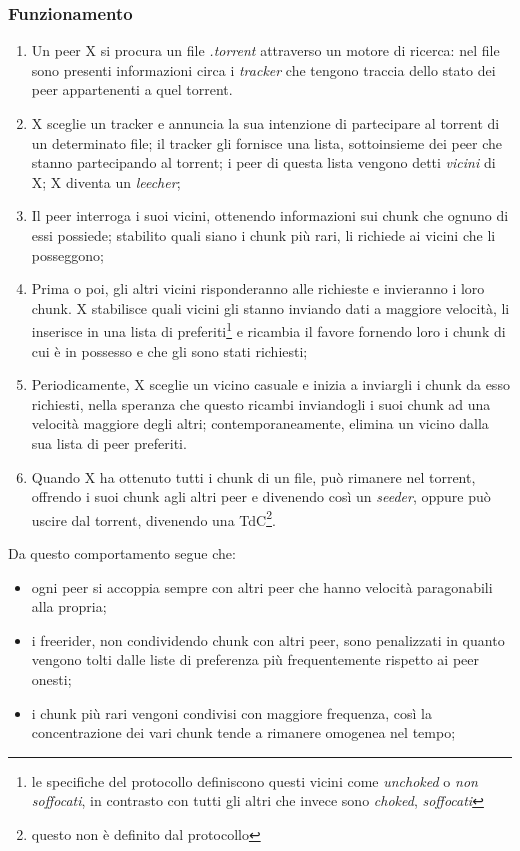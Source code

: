 \documentclass[12pt,a4paper]{article}
\begin{document}
\subsubsection{Funzionamento}
\begin{enumerate}
  \item Un peer X si procura un file \emph{.torrent} attraverso un
    motore di ricerca: nel file sono presenti informazioni circa i
    \emph{tracker} che tengono traccia dello stato dei peer
    appartenenti a quel torrent.
  \item X sceglie un tracker e annuncia la sua intenzione di
    partecipare al torrent di un determinato file; il tracker gli
    fornisce una lista, sottoinsieme dei peer che stanno partecipando
    al torrent; i peer di questa lista vengono detti \emph{vicini} di X;
    X diventa un \emph{leecher};
  \item Il peer interroga i suoi vicini, ottenendo
    informazioni sui chunk che ognuno di essi possiede; stabilito quali
    siano i chunk più rari, li richiede ai vicini che li posseggono;
  \item Prima o poi, gli altri vicini risponderanno alle richieste e
    invieranno i loro chunk. X stabilisce quali vicini gli stanno
    inviando dati a maggiore velocità, li inserisce in una lista di
    preferiti\footnote{le specifiche del protocollo definiscono questi
    vicini come \emph{unchoked} o \emph{non soffocati}, in contrasto
    con tutti gli altri che invece sono \emph{choked}, \emph{soffocati}}
    e ricambia il favore fornendo loro i chunk di cui è in possesso e
    che gli sono stati richiesti;
  \item Periodicamente, X sceglie un vicino casuale e inizia a inviargli
    i chunk da esso richiesti, nella speranza che questo ricambi
    inviandogli i suoi chunk ad una velocità maggiore degli altri;
    contemporaneamente, elimina un vicino dalla sua lista di peer
    preferiti.
  \item Quando X ha ottenuto tutti i chunk di un file, può rimanere nel
    torrent, offrendo i suoi chunk agli altri peer e divenendo così un
    \emph{seeder}, oppure può uscire dal torrent, divenendo una
    TdC\footnote{questo non è definito dal protocollo}.
\end{enumerate}

Da questo comportamento segue che:
\begin{itemize}
  \item ogni peer si accoppia sempre con altri peer che hanno velocità
    paragonabili alla propria;
  \item i freerider, non condividendo chunk con altri peer, sono
    penalizzati in quanto vengono tolti dalle liste di preferenza più
    frequentemente rispetto ai peer onesti;
  \item i chunk più rari vengoni condivisi con maggiore frequenza, così
    la concentrazione dei vari chunk tende a rimanere omogenea nel
    tempo;
\end{itemize}
\end{document}
